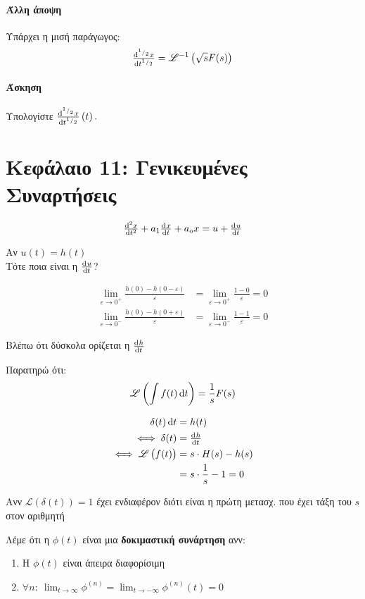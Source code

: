 \documentclass[11pt,a4paper,titlepage,draft]{article}
\begin{document}
\paragraph{Άλλη άποψη} Υπάρχει η μισή παράγωγος:
\[
\od[ ^1/_2]{x}{t} = \mathscr L^{-1} \left(
\sqrt{s} F(s)
\right)
\]

\paragraph{Άσκηση} Υπολογίστε \(
\od[ ^1/_2]{x}{t} \left(
t
\right).
\)

\section{Κεφάλαιο 11: Γενικευμένες Συναρτήσεις}
\[
\od[2]{x}{t} + a_1 \od{x}{t} + a_ox = u +\od{u}{t}
\]

Αν \( u(t)=h(t) \) \\ 
Τότε ποια είναι η \( \od{u}{t} \)?

\begin{align*}
\lim_{\varepsilon \to 0^+}\frac{h(0)-h(0-\varepsilon)}{\varepsilon} &= \lim_{\varepsilon \to 0^+}\frac{1-0}{\varepsilon} = 0\\
\lim_{\varepsilon\to0^-} \frac{h(0)-h(0+\varepsilon)}{\varepsilon}&=\lim_{\varepsilon\to0^-}\frac{1-1}{\varepsilon} = 0
\end{align*}

Βλέπω ότι δύσκολα ορίζεται η \( \od{h}{t} \)

Παρατηρώ ότι:
\[
\mathscr L \left(\int f(t)\dif t \right) = \frac{1}{s} F(s)
\]

\begin{align*}
\delta(t) \dif t &= h(t) \\
\iff \delta(t) &= \od{h}{t} \\
\iff \mathscr L \left(f(t) \right) &= s \cdot H(s) - h(s) \\
&= s \cdot \frac{1}{s} - 1 = 0
\end{align*}

Ανν \( \mathscr L \left( \delta(t) \right) =1 \) έχει ενδιαφέρον διότι είναι η πρώτη μετασχ. που έχει τάξη του \( s \) στον αριθμητή

\begin{defn}{}{}
Λέμε ότι η \( \phi(t) \) είναι μια \textbf{δοκιμαστική συνάρτηση} ανν:

\begin{enumerate}
\item Η \( \phi(t) \) είναι άπειρα διαφορίσιμη
\item \( \forall n:\ \lim_{t \to \infty}\phi^{(n)} = \lim_{t\to - \infty}\phi^{(n)}(t) = 0 \)
\end{enumerate}

\end{defn}
\end{document}
